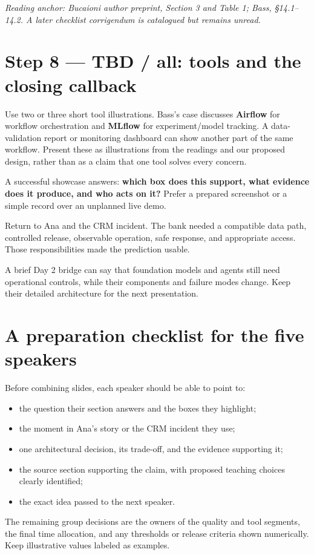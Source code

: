 \documentclass[12pt,a4paper]{article}
\newcommand{\source}[1]{\par\textcolor{teal!70!black}{\textit{Reading anchor: #1}}\par}
\begin{document}
\source{Bucaioni author preprint, Section 3 and Table 1; Bass, \S14.1--14.2. A later checklist corrigendum is catalogued but remains unread.}

\section{Step 8 --- TBD / all: tools and the closing callback}
Use two or three short tool illustrations. Bass's case discusses \textbf{Airflow} for workflow orchestration and \textbf{MLflow} for experiment/model tracking. A data-validation report or monitoring dashboard can show another part of the same workflow. Present these as illustrations from the readings and our proposed design, rather than as a claim that one tool solves every concern.

A successful showcase answers: \textbf{which box does this support, what evidence does it produce, and who acts on it?} Prefer a prepared screenshot or a simple record over an unplanned live demo.

Return to Ana and the CRM incident. The bank needed a compatible data path, controlled release, observable operation, safe response, and appropriate access. Those responsibilities made the prediction usable.

A brief Day 2 bridge can say that foundation models and agents still need operational controls, while their components and failure modes change. Keep their detailed architecture for the next presentation.

\section{A preparation checklist for the five speakers}
Before combining slides, each speaker should be able to point to:
\begin{itemize}
\item the question their section answers and the boxes they highlight;
\item the moment in Ana's story or the CRM incident they use;
\item one architectural decision, its trade-off, and the evidence supporting it;
\item the source section supporting the claim, with proposed teaching choices clearly identified;
\item the exact idea passed to the next speaker.
\end{itemize}

The remaining group decisions are the owners of the quality and tool segments, the final time allocation, and any thresholds or release criteria shown numerically. Keep illustrative values labeled as examples.
\end{document}
